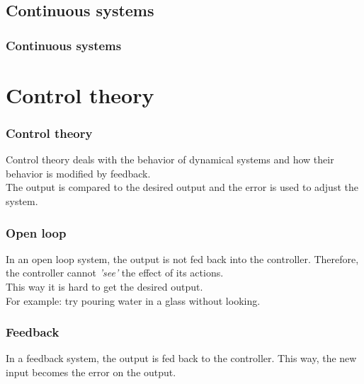 \documentclass{beamer}
\begin{document}
\subsection{Continuous systems} 

\begin{frame}
\frametitle{Continuous systems}

\end{frame}


\section{Control theory}

\begin{frame}
\frametitle{Control theory}
Control theory deals with the behavior of dynamical systems and how their behavior is modified by feedback.\\
The output is compared to the desired output and the error is used to adjust the system. 
\end{frame}


\begin{frame}
\frametitle{Open loop}
In an open loop system, the output is not fed back into the controller. Therefore, the controller cannot \textit{'see'} the effect of its actions. \\
This way it is hard to get the desired output.\\
\bigskip
For example: try pouring water in a glass without looking.
\end{frame}


\begin{frame}
\frametitle{Feedback}
In a feedback system, the output is fed back to the controller. This way, the new input becomes the error on the output. 
\end{frame}

\end{document}
